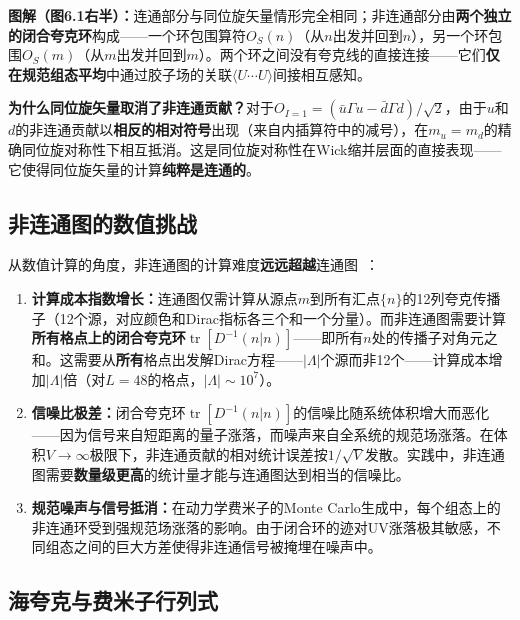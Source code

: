 \documentclass[12pt,a4paper]{ctexart}
\theoremstyle{definition}
\begin{document}
\textbf{图解（图6.1右半）：}连通部分与同位旋矢量情形完全相同；非连通部分由\textbf{两个独立的闭合夸克环}构成——一个环包围算符$O_S(n)$（从$n$出发并回到$n$），另一个环包围$O_S(m)$（从$m$出发并回到$m$）。两个环之间没有夸克线的直接连接——它们\textbf{仅在规范组态平均}中通过胶子场的关联$\langle U \cdots U \rangle$间接相互感知。

\textbf{为什么同位旋矢量取消了非连通贡献？}对于$O_{I=1} = (\bar u\Gamma u - \bar d\Gamma d)/\sqrt{2}$，由于$u$和$d$的非连通贡献以\textbf{相反的相对符号}出现（来自内插算符中的减号），在$m_u = m_d$的精确同位旋对称性下相互抵消。这是同位旋对称性在Wick缩并层面的直接表现——它使得同位旋矢量的计算\textbf{纯粹是连通的}。

\subsection{非连通图的数值挑战}

从数值计算的角度，非连通图的计算难度\textbf{远远超越}连通图~\cite{GattringerLang2010,Gupta1997intro}：

\begin{enumerate}[leftmargin=*]
    \item \textbf{计算成本指数增长：}连通图仅需计算从源点$m$到所有汇点$\{n\}$的12列夸克传播子（12个源，对应颜色和Dirac指标各三个和一个分量）。而非连通图需要计算\textbf{所有格点上的闭合夸克环}$\operatorname{tr}[D^{-1}(n|n)]$——即所有$n$处的传播子对角元之和。这需要从\textbf{所有}格点出发解Dirac方程——$|\Lambda|$个源而非12个——计算成本增加$|\Lambda|$倍（对$L=48$的格点，$|\Lambda| \sim 10^7$）。

    \item \textbf{信噪比极差：}闭合夸克环$\operatorname{tr}[D^{-1}(n|n)]$的信噪比随系统体积增大而恶化——因为信号来自短距离的量子涨落，而噪声来自全系统的规范场涨落。在体积$V \to \infty$极限下，非连通贡献的相对统计误差按$1/\sqrt{V}$发散。实践中，非连通图需要\textbf{数量级更高}的统计量才能与连通图达到相当的信噪比。

    \item \textbf{规范噪声与信号抵消：}在动力学费米子的Monte Carlo生成中，每个组态上的非连通环受到强规范场涨落的影响。由于闭合环的迹对UV涨落极其敏感，不同组态之间的巨大方差使得非连通信号被掩埋在噪声中。
\end{enumerate}

\subsection{海夸克与费米子行列式}
\end{document}
